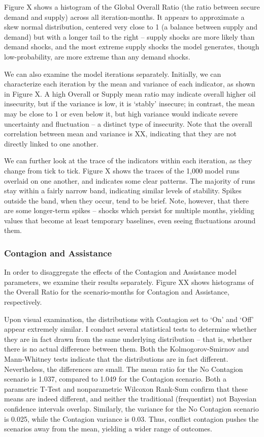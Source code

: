 \documentclass{article}
\begin{document}
Figure X shows a histogram of the Global Overall Ratio (the ratio between secure demand and supply) across all iteration-months. It appears to approximate a skew normal distribution, centered very close to 1 (a balance between supply and demand) but with a longer tail to the right -- supply shocks are more likely than demand shocks, and the most extreme supply shocks the model generates, though low-probability, are more extreme than any demand shocks. 

We can also examine the model iterations separately. Initially, we can characterize each iteration by the mean and variance of each indicator, as shown in Figure X. A high Overall or Supply mean ratio may indicate overall higher oil insecurity, but if the variance is low, it is `stably' insecure; in contrast, the mean may be close to 1 or even below it, but high variance would indicate severe uncertainty and fluctuation -- a distinct type of insecurity. Note that the overall correlation between mean and variance is XX, indicating that they are not directly linked to one another.

We can further look at the trace of the indicators within each iteration, as they change from tick to tick. Figure X shows the traces of the 1,000 model runs overlaid on one another, and indicates some clear patterns. The majority of runs stay within a fairly narrow band, indicating similar levels of stability. Spikes outside the band, when they occur, tend to be brief. Note, however, that there are some longer-term spikes -- shocks which persist for multiple months, yielding values that become at least temporary baselines, even seeing fluctuations around them.

\subsubsection{Contagion and Assistance}

In order to disaggregate the effects of the Contagion and Assistance model parameters, we examine their results separately. Figure XX shows histograms of the Overall Ratio for the scenario-months for Contagion and Assistance, respectively.

Upon visual examination, the distributions with Contagion set to `On' and `Off' appear extremely similar. I conduct several statistical tests to determine whether they are in fact drawn from the same underlying distribution -- that is, whether there is no actual difference between them. Both the Kolmogorov-Smirnov  and Mann-Whitney tests indicate that the distributions are in fact different. Nevertheless, the differences are small. The mean ratio for the No Contagion scenario is 1.037, compared to 1.049 for the Contagion scenario. Both a parametric T-Test and nonparametric Wilcoxon Rank-Sum confirm that these means are indeed different, and neither the traditional (frequentist) not Bayesian confidence intervals overlap. Similarly, the variance for the No Contagion scenario is 0.025, while the Contagion variance is 0.03. Thus, conflict contagion pushes the scenarios away from the mean, yielding a wider range of outcomes. 
\end{document}
